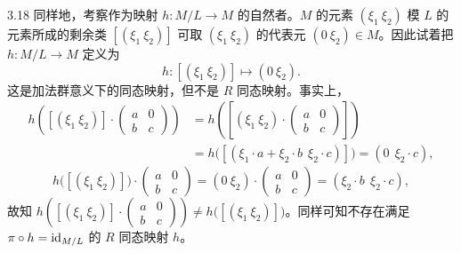 \begin{example}{3.18}
同样地，考察作为映射 $h\colon M/L\to M$ 的自然者。$M$ 的元素 $(\xi_1\ \xi_2)$ 模 $L$ 的元素所成的剩余类 $[(\xi_1\ \xi_2)]$ 可取 $(\xi_1\ \xi_2)$ 的代表元 $(0\ \xi_2)\in M$。因此试着把 $h\colon M/L\to M$ 定义为
\[
h\colon[(\xi_1\ \xi_2)]\mapsto(0\ \xi_2).
\]
这是加法群意义下的同态映射，但不是 $R$ 同态映射。事实上，
\[
\begin{aligned}
h\left([(\xi_1\ \xi_2)]\cdot\begin{pmatrix}a&0\\b&c\end{pmatrix}\right)
&=h\left(\left[(\xi_1\ \xi_2)\cdot\begin{pmatrix}a&0\\b&c\end{pmatrix}\right]\right)\\
&=h\big([(\xi_1\cdot a+\xi_2\cdot b\ \ \xi_2\cdot c)]\big)=(0\ \ \xi_2\cdot c),
\end{aligned}
\]
\[
h\big([(\xi_1\ \xi_2)]\big)\cdot\begin{pmatrix}a&0\\b&c\end{pmatrix}
=(0\ \xi_2)\cdot\begin{pmatrix}a&0\\b&c\end{pmatrix}=(\xi_2\cdot b\ \ \xi_2\cdot c),
\]
故知 $h\left([(\xi_1\ \xi_2)]\cdot\begin{pmatrix}a&0\\b&c\end{pmatrix}\right)\neq h\big([(\xi_1\ \xi_2)]\big)$。同样可知不存在满足 $\pi\circ h=\mathrm{id}_{M/L}$ 的 $R$ 同态映射 $h$。
\end{example}



